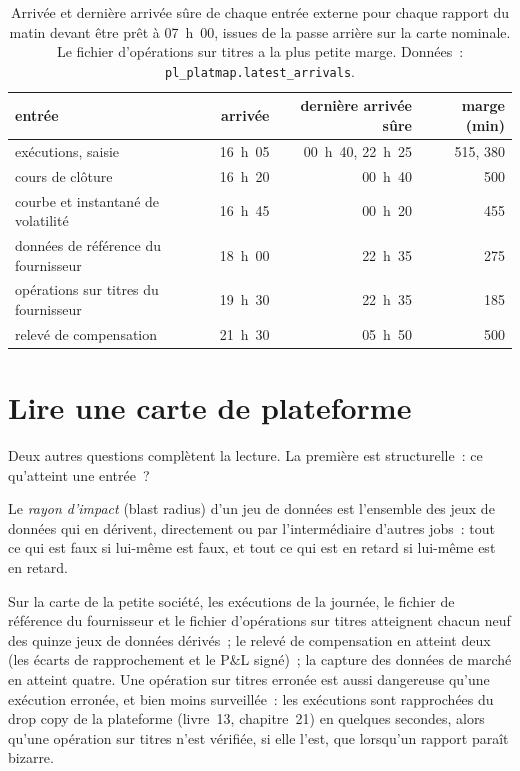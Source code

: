 \begin{table}[ht]
\centering\small
\begin{tabular}{lrrr}
\toprule
entrée & arrivée & dernière arrivée sûre & marge (min) \\
\midrule
exécutions, saisie & 16~h~05 & 00~h~40, 22~h~25 & 515, 380 \\
cours de clôture & 16~h~20 & 00~h~40 & 500 \\
courbe et instantané de volatilité & 16~h~45 & 00~h~20 & 455 \\
données de référence du fournisseur & 18~h~00 & 22~h~35 & 275 \\
opérations sur titres du fournisseur & 19~h~30 & 22~h~35 & 185 \\
relevé de compensation & 21~h~30 & 05~h~50 & 500 \\
\bottomrule
\end{tabular}
\caption{Arrivée et dernière arrivée sûre de chaque entrée externe pour chaque rapport du matin devant être prêt à 07~h~00, issues de la
passe arrière sur la carte nominale. Le fichier d'opérations sur titres a la plus petite marge. Données~: \texttt{pl\_platmap.latest\_arrivals}.}\label{tab:pl:the-platform-map:latest}
\end{table}

\section{Lire une carte de plateforme}

Deux autres questions complètent la lecture. La première est structurelle~: ce qu'atteint une entrée~?

\begin{definition}\label{def:pl:the-platform-map:blast}
Le \emph{rayon d'impact} (blast radius) d'un jeu de données est l'ensemble des jeux de données qui en dérivent, directement ou par
l'intermédiaire d'autres jobs~: tout ce qui est faux si lui-même est faux, et tout ce qui est en retard si lui-même est en retard.
\end{definition}

Sur la carte de la petite société, les exécutions de la journée, le fichier de référence du fournisseur et le fichier d'opérations sur titres
atteignent chacun neuf des quinze jeux de données dérivés~; le relevé de compensation en atteint
deux (les écarts de rapprochement et le P\&L signé)~; la capture des données de marché en atteint quatre. Une opération sur titres erronée est aussi dangereuse qu'une exécution erronée, et bien moins surveillée~:
les exécutions sont rapprochées du drop copy de la plateforme (livre~13, chapitre~21) en quelques secondes, alors qu'une opération sur titres
n'est vérifiée, si elle l'est, que lorsqu'un rapport paraît bizarre.

